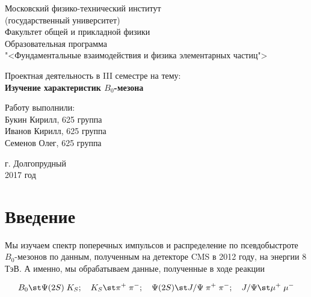 \documentclass[12pt]{kiarticle}
\begin{document}
	
	\begin{titlepage}
		\begin{center}
			\large 	Московский физико-технический институт \\
			(государственный университет) \\
			Факультет общей и прикладной физики \\
			Образовательная программа \\
			"<Фундаментальные взаимодействия и физика элементарных частиц">
			\vspace{0.2cm}
			
			\vspace{4.5cm}
			\large Проектная деятельность в III семестре на тему: \\ \vspace{0.2cm}
			\LARGE \textbf{Изучение характеристик $ B_0 $-мезона}
		\end{center}
		\vspace{2.3cm} \large
		
		\begin{center}
			Работу выполнили: \\
			Букин Кирилл,
			625 группа \\
			Иванов Кирилл,
			625 группа \\
			Семенов Олег,
			625 группа
			\vspace{10mm}		
			
		\end{center}
		
		\begin{center} \vspace{60mm}
			г. Долгопрудный \\
			2017 год
		\end{center}
	\end{titlepage}
	
\section{Введение}

	Мы изучаем спектр поперечных импульсов и распределение по псевдобыстроте  $ B_0 $-мезонов по данным, полученным на детекторе CMS в 2012 году, на энергии 8 ТэВ. А именно, мы обрабатываем  данные, полученные в ходе реакции
	
	\begin{equation}\label{}
	B_0 \st \Psi(2S) \; K_S; \quad K_S \st \pi^+ \; \pi^-; \quad \Psi(2S) \st J/\Psi \; \pi^+ \; \pi^-; \quad J/\Psi  \st \mu^+ \; \mu^- 
	\end{equation}
	
\end{document}
